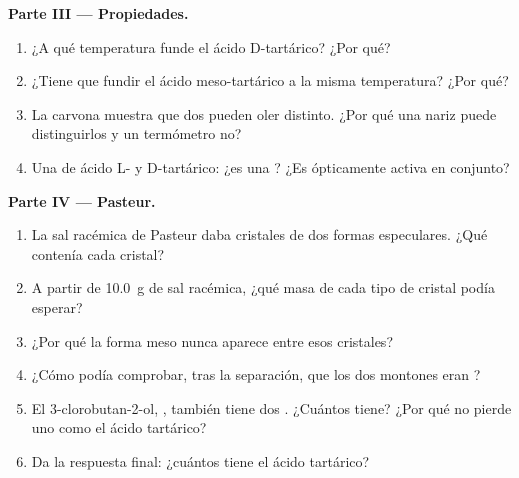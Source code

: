 \begin{problem}
\medskip
\noindent\textbf{Parte III --- Propiedades.}
\begin{enumerate}[resume]
  \item ¿A qué temperatura funde el ácido D-tartárico? ¿Por qué?
  \item ¿Tiene que fundir el ácido meso-tartárico a la misma temperatura?
        ¿Por qué?
  \item La carvona muestra que dos  pueden oler distinto.
        ¿Por qué una nariz puede distinguirlos y un termómetro no?
  \item Una  de ácido L- y D-tartárico: ¿es una ? ¿Es ópticamente activa en conjunto?
\end{enumerate}

\medskip
\noindent\textbf{Parte IV --- Pasteur.}
\begin{enumerate}[resume]
  \item La sal racémica de Pasteur daba cristales de dos formas
        especulares. ¿Qué contenía cada cristal?
  \item A partir de \qty{10.0}{g} de sal racémica, ¿qué masa de cada tipo
        de cristal podía esperar?
  \item ¿Por qué la forma meso nunca aparece entre esos cristales?
  \item ¿Cómo podía comprobar, tras la separación, que los dos montones
        eran ?
  \item El 3-clorobutan-2-ol, , también tiene dos
        . ¿Cuántos  tiene? ¿Por qué no
        pierde uno como el ácido tartárico?
  \item Da la respuesta final: ¿cuántos  tiene el ácido
        tartárico?
\end{enumerate}
\end{problem}

